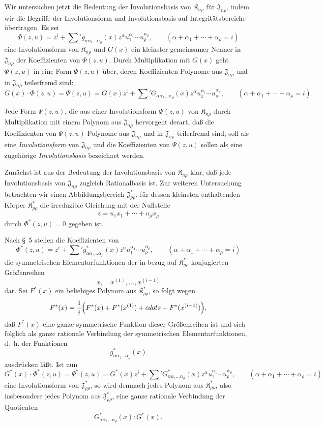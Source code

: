 \documentclass[11pt]{article}
\providecommand{\Kfield}{\mathfrak{K}}
\providecommand{\Jdom}{\mathfrak{J}}
\begin{document}
Wir untersuchen jetzt die Bedeutung der Involutionsbasis von $\Kfield_{n\rho}$ für $\Jdom_{n\rho}$, indem wir die Begriffe der Involutionsform und Involutionsbasis auf Integritätsbereiche übertragen. Es sei
\[
  \Phi(z,u)=z^i+\sum{}' g_{\alpha\alpha_1\ldots\alpha_\rho}(x)
  z^\alpha u_1^{\alpha_1}\cdots u_\rho^{\alpha_\rho},
  \qquad
  (\alpha+\alpha_1+\cdots+\alpha_\rho=i)
\]
eine Involutionsform von $\Kfield_{n\rho}$ und $G(x)$ ein kleinster gemeinsamer Nenner in $\Jdom_{n\rho}$ der Koeffizienten von $\Phi(z,u)$. Durch Multiplikation mit $G(x)$ geht $\Phi(z,u)$ in eine Form $\Psi(z,u)$ über, deren Koeffizienten Polynome aus $\Jdom_{n\rho}$ und in $\Jdom_{n\rho}$ teilerfremd sind:
\[
  G(x)\cdot\Phi(z,u)=\Psi(z,u)
  =G(x)z^i+
  \sum{}' G_{\alpha\alpha_1\ldots\alpha_\rho}(x)
  z^\alpha u_1^{\alpha_1}\cdots u_\rho^{\alpha_\rho},
  \qquad
  (\alpha+\alpha_1+\cdots+\alpha_\rho=i).
\]

Jede Form $\Psi(z,u)$, die aus einer Involutionsform $\Phi(z,u)$ von $\Kfield_{n\rho}$ durch Multiplikation mit einem Polynom aus $\Jdom_{n\rho}$ hervorgeht derart, daß die Koeffizienten von $\Psi(z,u)$ Polynome aus $\Jdom_{n\rho}$ und in $\Jdom_{n\rho}$ teilerfremd sind, soll als eine \emph{Involutionsform} von $\Jdom_{n\rho}$ und die Koeffizienten von $\Psi(z,u)$ sollen als eine zugehörige \emph{Involutionsbasis} bezeichnet werden.

Zunächst ist aus der Bedeutung der Involutionsbasis von $\Kfield_{n\rho}$ klar, daß jede Involutionsbasis von $\Jdom_{n\rho}$ zugleich Rationalbasis ist. Zur weiteren Untersuchung betrachten wir einen Abbildungsbereich $\Jdom^*_{\rho\rho}$, für dessen kleinsten enthaltenden Körper $\Kfield^*_{\rho\rho}$ die irreduzible Gleichung mit der Nullstelle
\[
  z=u_1x_1+\cdots+u_\rho x_\rho
\]
durch $\Phi^*(z,u)=0$ gegeben ist.

Nach \S\ 5 stellen die Koeffizienten von
\[
  \Phi^*(z,u)=z^i+\sum{}' g^*_{\alpha\alpha_1\ldots\alpha_\rho}(x)
  z^\alpha u_1^{\alpha_1}\cdots u_\rho^{\alpha_\rho},
  \qquad
  (\alpha+\alpha_1+\cdots+\alpha_\rho=i)
\]
die symmetrischen Elementarfunktionen der in bezug auf $\Kfield^*_{\rho\rho}$ konjugierten Größenreihen
\[
  x,\quad x^{(1)},\ldots,x^{(i-1)}
\]
dar. Sei $F^*(x)$ ein beliebiges Polynom aus $\Kfield^*_{\rho\rho}$, so folgt wegen
\[
  F^*(x)=\frac1i\Bigl(F^*(x)+F^*(x^{(1)})+\\cdots+F^*(x^{(i-1)})\Bigr),
\]
daß $F^*(x)$ eine ganze symmetrische Funktion dieser Größenreihen ist und sich folglich als ganze rationale Verbindung der symmetrischen Elementarfunktionen, d.~h. der Funktionen
\[
  g^*_{\alpha\alpha_1\ldots\alpha_\rho}(x)
\]
ausdrücken läßt. Ist nun
\[
  G^*(x)\cdot\Phi^*(z,u)=\Psi^*(z,u)
  =G^*(x)z^i+
  \sum{}'G^*_{\alpha\alpha_1\ldots\alpha_\rho}(x)
  z^\alpha u_1^{\alpha_1}\cdots u_\rho^{\alpha_\rho},
  \qquad
  (\alpha+\alpha_1+\cdots+\alpha_\rho=i)
\]
eine Involutionsform von $\Jdom^*_{\rho\rho}$, so wird demnach jedes Polynom aus $\Kfield^*_{\rho\rho}$, also insbesondere jedes Polynom aus $\Jdom^*_{\rho\rho}$, eine ganze rationale Verbindung der Quotienten
\[
  G^*_{\alpha\alpha_1\ldots\alpha_\rho}(x):G^*(x).
\]
\end{document}
